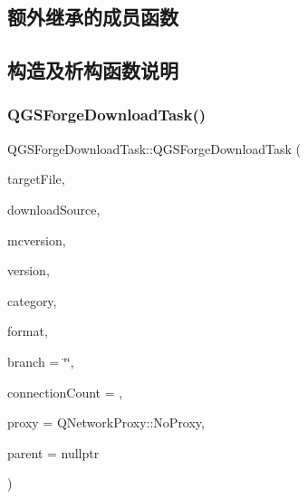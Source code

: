 \subsection*{额外继承的成员函数}


\subsection{构造及析构函数说明}
\mbox{\label{class_q_g_s_forge_download_task_a421545f8dc598d2f1c4832936872a85b}} 
\subsubsection{\texorpdfstring{Q\+G\+S\+Forge\+Download\+Task()}{QGSForgeDownloadTask()}\hspace{0.1cm}{\footnotesize\ttfamily [1/3]}}
{\footnotesize\ttfamily Q\+G\+S\+Forge\+Download\+Task\+::\+Q\+G\+S\+Forge\+Download\+Task (\begin{DoxyParamCaption}\item[{Q\+File $\ast$}]{target\+File,  }\item[{\mbox{\hyperlink{class_q_g_s_i_download_source}{Q\+G\+S\+I\+Download\+Source}} $\ast$}]{download\+Source,  }\item[{const Q\+String \&}]{mcversion,  }\item[{const Q\+String \&}]{version,  }\item[{const Q\+String \&}]{category,  }\item[{const Q\+String \&}]{format,  }\item[{const Q\+String \&}]{branch = {\ttfamily \char`\"{}\char`\"{}},  }\item[{int}]{connection\+Count = {},  }\item[{const Q\+Network\+Proxy \&}]{proxy = {\ttfamily QNetworkProxy\+:\+:NoProxy},  }\item[{Q\+Object $\ast$}]{parent = {\ttfamily nullptr} }\end{DoxyParamCaption})}

\mbox{\label{class_q_g_s_forge_download_task_a3f707e4bae34a300aeb27508d8e251d3}} 
